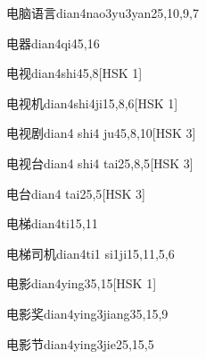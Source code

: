 \begin{entry}{电脑语言}{dian4nao3yu3yan2}{5,10,9,7}
\end{entry}

\begin{entry}{电器}{dian4qi4}{5,16}
\end{entry}

\begin{entry}{电视}{dian4shi4}{5,8}[HSK 1]
\end{entry}

\begin{entry}{电视机}{dian4shi4ji1}{5,8,6}[HSK 1]
\end{entry}

\begin{entry}{电视剧}{dian4 shi4 ju4}{5,8,10}[HSK 3]
\end{entry}

\begin{entry}{电视台}{dian4 shi4 tai2}{5,8,5}[HSK 3]
\end{entry}

\begin{entry}{电台}{dian4 tai2}{5,5}[HSK 3]
\end{entry}

\begin{entry}{电梯}{dian4ti1}{5,11}
\end{entry}

\begin{entry}{电梯司机}{dian4ti1 si1ji1}{5,11,5,6}
\end{entry}

\begin{entry}{电影}{dian4ying3}{5,15}[HSK 1]
\end{entry}

\begin{entry}{电影奖}{dian4ying3jiang3}{5,15,9}
\end{entry}

\begin{entry}{电影节}{dian4ying3jie2}{5,15,5}
\end{entry}

